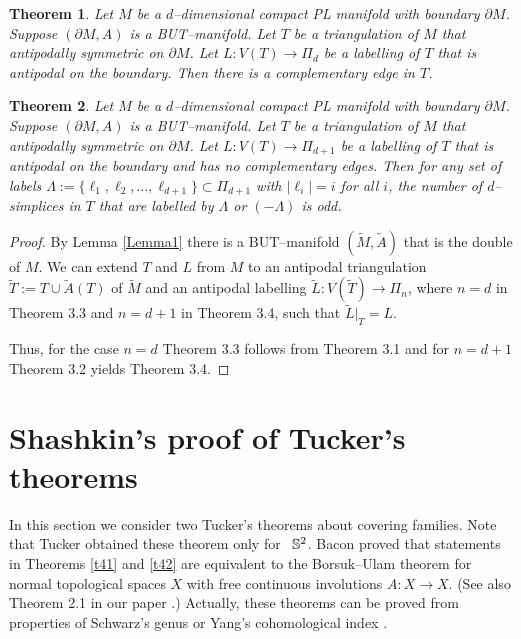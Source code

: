 \documentclass[a4paper,12pt]{article}
\newtheorem{theorem}{Theorem}[section]
\begin{document}
\begin{theorem}
	Let $M$ be a $d$--dimensional compact PL manifold with boundary $\partial M$. Suppose  $(\partial M,A)$ is a BUT--manifold.
Let $T$ be a triangulation of  $M$ that antipodally symmetric on $\partial M$. Let $L:V(T)\to\Pi_d$ be a   labelling of  $T$ that is antipodal on the boundary. Then there is a complementary edge in $T$.
\end{theorem}	

\begin{theorem}
	Let $M$ be a $d$--dimensional  compact PL manifold with boundary $\partial M$. Suppose  $(\partial M,A)$ is a BUT--manifold.
Let $T$ be a triangulation of  $M$ that antipodally symmetric on $\partial M$.  Let $L:V(T)\to\Pi_{d+1}$ be a   labelling of  $T$ that is antipodal on the boundary and has no complementary edges. Then for any set of  labels $\Lambda:=\{\ell_1,\ell_2,\ldots,\ell_{d+1}\}\subset\Pi_{d+1}$ with $|\ell_i|=i$ for all $i$, the number of $d$--simplices in $T$ that are labelled by $\Lambda$ or $(-\Lambda)$  is odd.
\end{theorem}
\begin{proof} By Lemma \ref{Lemma1} there is a BUT--manifold $(\tilde M,\tilde A)$ that is the double of $M$.  We can extend  $T$ and $L$ from $M$ to an antipodal triangulation $\tilde T:=T\cup\tilde A(T)$ of $\tilde M$ and an antipodal labelling $\tilde L:V(\tilde T)\to \Pi_n$, where $n=d$ in Theorem 3.3 and $n=d+1$ in Theorem 3.4, such that $\tilde L|_T=L$.
	
Thus, for the case $n=d$ Theorem 3.3 follows from Theorem 3.1 and for $n=d+1$ Theorem 3.2 yields Theorem 3.4.
\end{proof}

\section{Shashkin's proof of Tucker's theorems}

In this section we consider two Tucker's theorems about covering families. 
Note that Tucker \cite{Tucker} obtained these theorem only for \, ${\Bbb S}^2$. Bacon \cite{Bacon} proved that statements in Theorems \ref{t41} and \ref{t42} are equivalent to the Borsuk--Ulam theorem for normal topological spaces $X$ with free continuous involutions $A:X\to X$.  (See also Theorem 2.1 in our paper \cite{MusVo}.)  Actually, these theorems  can be proved from properties of Schwarz's genus \cite{Sv} or Yang's cohomological index  \cite{Kar,MusVo}. 
\end{document}
